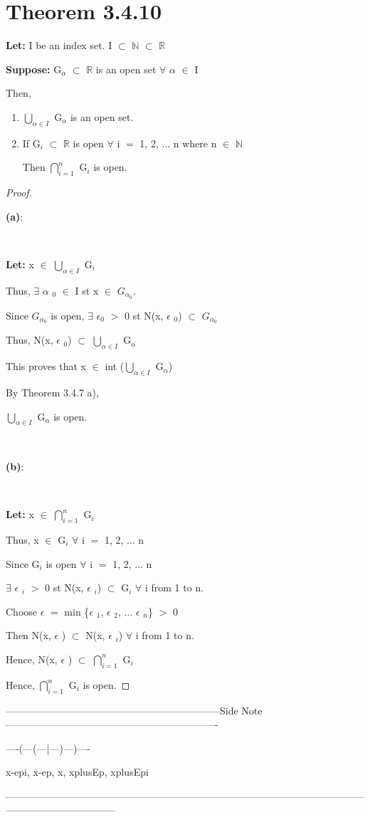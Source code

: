 \documentclass{article}
\newcommand{\mt}[1]{\ensuremath{#1}}
\newcommand\bsc[2][\DefaultOpt]{%
  \def\DefaultOpt{#2}%
  \section[#1]{#2}%
}
\newcommand{\bgpf}{\begin{proof} $ $\newline}
\newcommand{\balist}{\begin{enumerate}[label=\alph*.]}
\newcommand{\elist}{\end{enumerate}}
\newcommand{\lt}[1]{\textbf{Let: } #1}
\newcommand{\supp}[1]{\textbf{Suppose: } #1}
\newcommand{\bpth}[1]{\textbf{(#1)}}
\newcommand{\epf}{\end{proof}}
\newcommand{\dbs}[3]{\mt{#1_{#2_#3}}}
\newcommand{\sidenote}[1]{-----------------------------------------------------------------Side Note----------------------------------------------------------------
#1 \

---------------------------------------------------------------------------------------------------------------------------------------------}
\newcommand{\br}{\mt{\mathbb{R}} }       %
\newcommand{\bn}{\mt{\mathbb{N}} }       %
\newcommand{\ep}{\mt{\epsilon} }         %
\newcommand{\fa}{\mt{\forall} }          %
\newcommand{\afa}{\mt{\alpha} }
\newcommand{\mem}{\mt{\in} }
\newcommand{\exs}{\mt{\exists} }
\newcommand{\sbs}{\mt{\subset} }         %
\newcommand{\eql}{\mt{=} }
\newcommand{\uw}[2]{#1\mt{_{#2}}}
\newcommand{\urng}[2]{\mt{\bigcup_{#1}^{#2}}}
\newcommand{\nrng}[2]{\mt{\bigcap_{#1}^{#2}}}
\begin{document}
\bsc{Theorem 3.4.10}{

\lt{I be an index set. I \sbs \bn \sbs \br}

\supp{\uw{G}{\afa} \sbs \br is an open set \fa \afa \mem I}

Then, 

\balist
\item \urng{\afa \mem I}{} \uw{G}{\afa} is an open set.
\item If \uw{G}{i} \sbs \br is open \fa i \eql 1, 2, ... n where n \mem \bn
	
	Then \nrng{i = 1}{n} \uw{G}{i} is open.
\elist

\bgpf

\bpth{a}: \

\

\lt{x \mem \urng{\afa \mem I}{} \uw{G}{i}}

Thus, \exs \uw{\afa}{0} \mem I st x \mem \dbs{G}{\afa}{0}.

Since \dbs{G}{\afa}{0} is open, \exs \uw{$\epsilon$}{0} $>$ 0 st N(x, \uw{\ep}{0}) \sbs \dbs{G}{\afa}{0}

Thus, N(x, \uw{\ep}{0}) \sbs \urng{\afa \mem I}{} \uw{G}{\afa}

This proves that x \mem int (\urng{\afa \mem I}{} \uw{G}{\afa})

By Theorem 3.4.7 a),

\urng{\afa \mem I}{} \uw{G}{\afa} is open. \

\

\bpth{b}: \

\

\lt{x \mem \nrng{i = 1}{n} \uw{G}{i}}

Thus, x \mem \uw{G}{i} \fa i \eql 1, 2, ... n

Since \uw{G}{i} is open \fa i \eql 1, 2, ... n

\exs \uw{\ep}{i} $>$ 0 st N(x, \uw{\ep}{i}) \sbs \uw{G}{i}  \fa i from 1 to n.

Choose \ep \eql min \{\uw{\ep}{1}, \uw{\ep}{2}, ... \uw{\ep}{n}\} $>$ 0

Then N(x, \ep) \sbs N(x, \uw{\ep}{i}) \fa i from 1 to n.

Hence, N(x, \ep) \sbs \nrng{i = 1}{n} \uw{G}{i}

Hence, \nrng{i = 1}{n} \uw{G}{i} is open.
\epf

\sidenote{
----(---(---|---)---)----

x-epi, x-ep, x, xplusEp, xplusEpi
}

}
\end{document}
